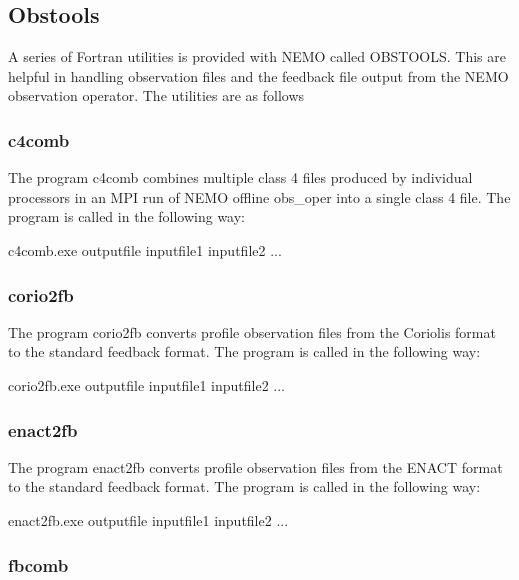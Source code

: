 \documentclass[../main/NEMO_manual]{subfiles}
\begin{document}
\subsection{Obstools}

A series of Fortran utilities is provided with NEMO called OBSTOOLS.
This are helpful in handling observation files and the feedback file output from the NEMO observation operator.
The utilities are as follows

\subsubsection{c4comb}

The program c4comb combines multiple class 4 files produced by individual processors in
an MPI run of NEMO offline obs\_oper into a single class 4 file.
The program is called in the following way:


\footnotesize
\begin{cmds}
c4comb.exe outputfile inputfile1 inputfile2 ...
\end{cmds}

\subsubsection{corio2fb}

The program corio2fb converts profile observation files from the Coriolis format to the standard feedback format.
The program is called in the following way:

\footnotesize
\begin{cmds}
corio2fb.exe outputfile inputfile1 inputfile2 ...
\end{cmds}

\subsubsection{enact2fb}

The program enact2fb converts profile observation files from the ENACT format to the standard feedback format.
The program is called in the following way:

\footnotesize
\begin{cmds}
enact2fb.exe outputfile inputfile1 inputfile2 ...
\end{cmds}

\subsubsection{fbcomb}
\end{document}

